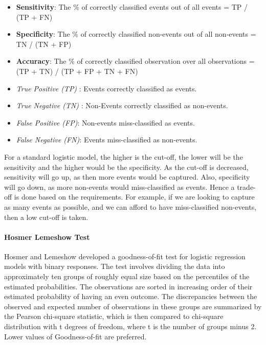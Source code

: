 \documentclass[
]{article}
\begin{document}
\begin{itemize}
\item
  \textbf{Sensitivity}: The \% of correctly classified events out of all
  events = TP / (TP + FN)
\item
  \textbf{Specificity}: The \% of correctly classified non-events out of
  all non-events = TN / (TN + FP)
\item
  \textbf{Accuracy}: The \% of correctly classified observation over all
  observations = (TP + TN) / (TP + FP + TN + FN)
\item
  \emph{True Positive (TP)} : Events correctly classified as events.
\item
  \emph{True Negative (TN)} : Non-Events correctly classified as
  non-events.
\item
  \emph{False Positive (FP)}: Non-events miss-classified as events.
\item
  \emph{False Negative (FN)}: Events miss-classified as non-events.
\end{itemize}

For a standard logistic model, the higher is the cut-off, the lower will
be the sensitivity and the higher would be the specificity. As the
cut-off is decreased, sensitivity will go up, as then more events would
be captured. Also, specificity will go down, as more non-events would
miss-classified as events. Hence a trade-off is done based on the
requirements. For example, if we are looking to capture as many events
as possible, and we can afford to have miss-classified non-events, then
a low cut-off is taken.

\hypertarget{hosmer-lemeshow-test}{%
\paragraph{Hosmer Lemeshow Test}\label{hosmer-lemeshow-test}}

Hosmer and Lemeshow developed a goodness-of-fit test for logistic
regression models with binary responses. The test involves dividing the
data into approximately ten groups of roughly equal size based on the
percentiles of the estimated probabilities. The observations are sorted
in increasing order of their estimated probability of having an even
outcome. The discrepancies between the observed and expected number of
observations in these groups are summarized by the Pearson chi-square
statistic, which is then compared to chi-square distribution with t
degrees of freedom, where t is the number of groups minus 2. Lower
values of Goodness-of-fit are preferred.
\end{document}
